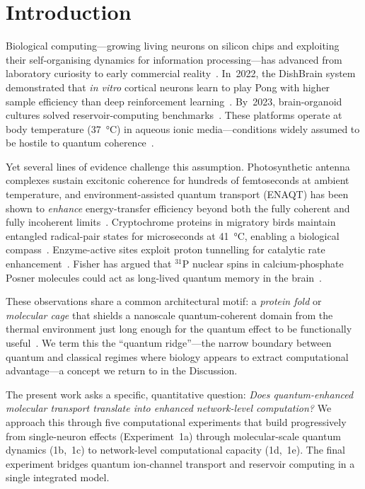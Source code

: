 \documentclass[twocolumn,11pt]{article}
\begin{document}
\section{Introduction}
\label{sec:intro}

Biological computing---growing living neurons on silicon chips
and exploiting their self-organising dynamics for information
processing---has advanced from laboratory curiosity to early
commercial reality~\cite{Kagan2022,Smirnova2023,Cai2023}.
In~2022, the DishBrain system demonstrated that
\textit{in vitro} cortical neurons learn to play Pong with
higher sample efficiency than deep reinforcement
learning~\cite{Kagan2022}.  By~2023, brain-organoid cultures
solved reservoir-computing benchmarks~\cite{Cai2023}.
These platforms operate at body temperature (\SI{37}{\celsius})
in aqueous ionic media---conditions widely assumed to be hostile
to quantum coherence~\cite{Tegmark2000}.

Yet several lines of evidence challenge this assumption.
Photosynthetic antenna complexes sustain excitonic coherence for
hundreds of femtoseconds at ambient temperature, and
environment-assisted quantum transport (ENAQT) has been shown to
\emph{enhance} energy-transfer efficiency beyond both the
fully coherent and fully incoherent
limits~\cite{Engel2007,Mohseni2008,Plenio2008,Rebentrost2009}.
Cryptochrome proteins in migratory birds maintain entangled
radical-pair states for microseconds at \SI{41}{\celsius}, enabling
a biological compass~\cite{Xu2021}.
Enzyme-active sites exploit proton tunnelling for catalytic
rate enhancement~\cite{Scrutton2012}.
Fisher has argued that $^{31}$P nuclear spins in
calcium-phosphate Posner molecules could act as long-lived
quantum memory in the brain~\cite{Fisher2015}.

These observations share a common architectural motif: a
\emph{protein fold} or \emph{molecular cage} that shields a
nanoscale quantum-coherent domain from the thermal environment
just long enough for the quantum effect to be functionally
useful~\cite{Lambert2013,Cao2020,Kim2021}.
We term this the ``quantum ridge''---the narrow boundary between
quantum and classical regimes where biology appears to extract
computational advantage---a concept we return to in the
Discussion.

The present work asks a specific, quantitative question:
\emph{Does quantum-enhanced molecular transport translate into
enhanced network-level computation?}
We approach this through five computational experiments that
build progressively from single-neuron effects (Experiment~1a)
through molecular-scale quantum dynamics (1b,~1c) to
network-level computational capacity (1d,~1e).  The final
experiment bridges quantum ion-channel transport and reservoir
computing in a single integrated model.
\end{document}
